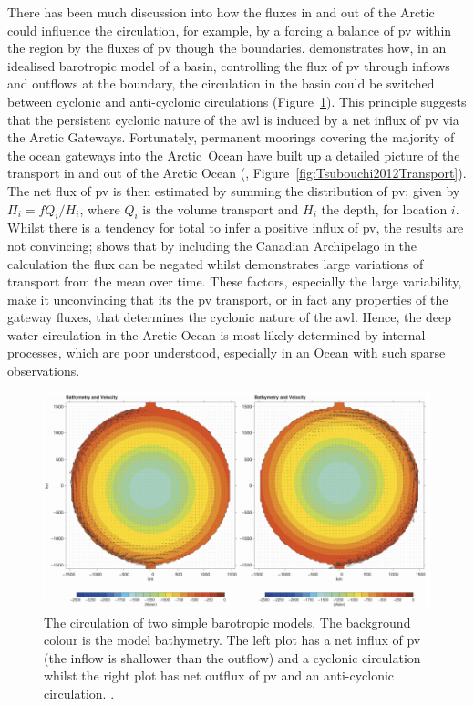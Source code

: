 \documentclass[12pt,a4paper]{report}
\newcommand*\figref[1]{Figure~\ref{#1}}
\begin{document}
There has been much discussion
into how the fluxes in and out of the Arctic could influence the circulation,
for example, by a forcing a balance of \gls{pv} within the region by
the fluxes of \gls{pv} though the boundaries. \cite{yang2005arctic} demonstrates how,
in an idealised barotropic model of a basin, controlling the flux 
of \gls{pv} through inflows and outflows
at the boundary, the circulation in the basin could be switched between cyclonic and
anti-cyclonic circulations (\figref{fig:Yang2005}). This principle suggests
that the persistent cyclonic nature of the \gls{awl} is induced by a 
net influx of \gls{pv} via the Arctic Gateways. Fortunately, permanent moorings 
covering the majority of the ocean gateways into the Arctic~Ocean have built
up a detailed picture of the transport in and out of the Arctic Ocean 
(\cite{tsubouchi2012arctic}, \figref{fig:Tsubouchi2012Transport}). The net flux of \gls{pv} is then estimated by summing the distribution of \gls{pv}; given by $ \Pi_{i} = fQ_{i}/H_{i}$,
where $Q_{i}$ is the volume transport and $H_i$ the depth, for location $i$. 
Whilst there is a tendency for total to infer a positive influx of \gls{pv}, the
results are not convincing; \cite{munchow2006observational} shows that by including the
Canadian Archipelago in the \cite{yang2005arctic} calculation the flux can be negated whilst
\cite{tsubouchi2012arctic} demonstrates large variations of transport from the mean over time.
These factors, especially the large variability, make it unconvincing that its the \gls{pv}
 transport, or in fact any properties of the gateway fluxes, that determines the 
cyclonic nature of the \gls{awl}.
Hence, the deep water circulation in the Arctic Ocean is most likely determined by 
internal processes, which are poor understood, especially in an Ocean with such sparse observations.

\begin{figure}
	\centering
	\includegraphics[width=\linewidth]{Yang2005}
	\caption[\cite{yang2005arctic}]{ The circulation of two simple barotropic
		models. The background colour is the model bathymetry. The left plot has
		a net influx of \gls{pv} (the inflow is shallower than the outflow) 
		and a cyclonic circulation whilst the right plot has net outflux of  \gls{pv} 
		and an anti-cyclonic circulation. \cite{yang2005arctic}.}
	\label{fig:Yang2005}
\end{figure}
\end{document}
